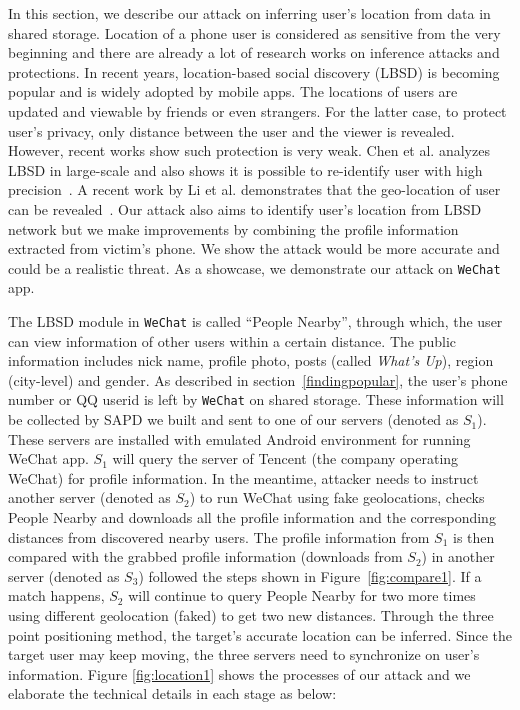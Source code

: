 \documentclass{sig-alternate}
\begin{document}
In this section, we describe our attack on inferring user's location from data in shared storage. Location of a phone user is considered as sensitive from the very beginning and there are already a lot of research works on inference attacks and protections. In recent years, location-based social discovery (LBSD) is becoming popular and is widely adopted by mobile apps. The locations of users are updated and viewable by friends or even strangers. For the latter case, to protect user's privacy, only distance between the user and the viewer is revealed. However, recent works show such protection is very weak. Chen et al. analyzes LBSD in large-scale and also shows it is possible to re-identify user with high precision~\cite{chen2013and}. A recent work by Li et al. demonstrates that the geo-location of user can be revealed~\cite{li2013all}. Our attack also aims to identify user's location from LBSD network but we make improvements by combining the profile information extracted from victim's phone. We show the attack would be more accurate and could be a realistic threat. As a showcase, we demonstrate our attack on \texttt{WeChat} app.



The LBSD module in \texttt{WeChat} is called ``People Nearby'', through which, the user can view information of other users within a certain distance. The public information includes nick name, profile photo, posts (called \textit{What's Up}), region (city-level) and gender. As described in section~\ref{findingpopular}, the user's phone number or QQ userid is left by \texttt{WeChat} on shared storage. These information will be collected by SAPD we built and sent to one of our servers (denoted as $S_1$). These servers are installed with emulated Android environment for running WeChat app. $S_1$ will query the server of Tencent (the company operating WeChat) for profile information. In the meantime, attacker needs to instruct another server (denoted as $S_2$) to run WeChat using fake geolocations, checks People Nearby and downloads all the profile information and the corresponding distances from discovered nearby users. The profile information from $S_1$ is then compared with the grabbed profile information (downloads from $S_2$) in another server (denoted as $S_3$) followed the steps shown in Figure~\ref{fig:compare1}. If a match happens,  $S_2$ will continue to query People Nearby for two more times using different geolocation (faked) to get two new distances. Through the three point positioning method, the target's accurate location can be inferred. Since the target user may keep moving, the three servers need to synchronize on user's information. Figure \ref{fig:location1} shows the processes of our attack and we elaborate the technical details in each stage as below:
\end{document}

